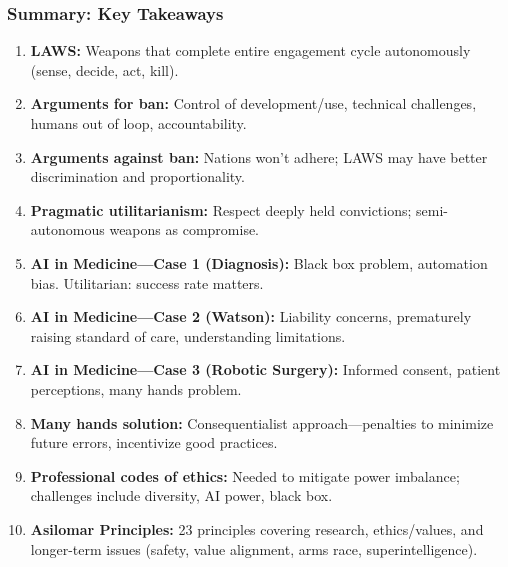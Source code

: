 \bigseparator

\subsubsection{Summary: Key Takeaways}

\begin{keybox}
\begin{enumerate}
  \item \textbf{LAWS:} Weapons that complete entire engagement cycle autonomously (sense, decide, act, kill).
  \item \textbf{Arguments for ban:} Control of development/use, technical challenges, humans out of loop, accountability.
  \item \textbf{Arguments against ban:} Nations won't adhere; LAWS may have better discrimination and proportionality.
  \item \textbf{Pragmatic utilitarianism:} Respect deeply held convictions; semi-autonomous weapons as compromise.
  \item \textbf{AI in Medicine---Case 1 (Diagnosis):} Black box problem, automation bias. Utilitarian: success rate matters.
  \item \textbf{AI in Medicine---Case 2 (Watson):} Liability concerns, prematurely raising standard of care, understanding limitations.
  \item \textbf{AI in Medicine---Case 3 (Robotic Surgery):} Informed consent, patient perceptions, many hands problem.
  \item \textbf{Many hands solution:} Consequentialist approach---penalties to minimize future errors, incentivize good practices.
  \item \textbf{Professional codes of ethics:} Needed to mitigate power imbalance; challenges include diversity, AI power, black box.
  \item \textbf{Asilomar Principles:} 23 principles covering research, ethics/values, and longer-term issues (safety, value alignment, arms race, superintelligence).
\end{enumerate}
\end{keybox}

